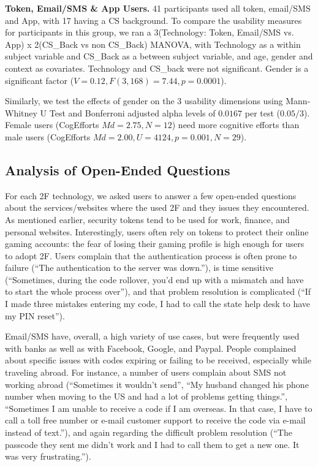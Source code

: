 \documentclass[conference]{IEEEtran}
\newcommand{\descr}[1]{\vspace{0.25cm} \noindent \textbf{#1}}
\begin{document}
\descr{Token, Email/SMS \& App Users.} 41 participants used all token, email/SMS and App, with 17 having a CS background. To compare the usability measures for participants in this group, we ran a 3(Technology: Token, Email/SMS vs. App) x 2(CS\_Back vs non CS\_Back) MANOVA, with Technology as a within subject variable and CS\_Back as a between subject variable, and age, gender and context as covariates. Technology and CS\_back were not significant. Gender is a significant factor ($V= 0.12, F(3,168) = 7.44, p = 0.0001$).



Similarly, we test the effects of gender on the 3 usability dimensions using Mann-Whitney U Test  and Bonferroni adjusted alpha levels of $0.0167$ per test ($0.05/3$). Female users (CogEfforts $Md = 2.75, N = 12$) need more cognitive efforts than male users (CogEfforts $Md = 2.00, U= 4124, p = 0.001, N = 29$).






\subsection{Analysis of Open-Ended Questions}
For each 2F technology, we asked users to answer a few open-ended questions about the services/websites where the used 2F and they issues they encountered. 
As mentioned earlier, security tokens tend to be used for work, finance, and personal websites. Interestingly, users often rely on tokens to protect their online gaming accounts: the fear of losing their gaming profile is high enough for users to adopt 2F. Users complain that the authentication process is often prone to failure (``The authentication to the server was down.''), is time sensitive (``Sometimes, during the code rollover, you'd end up with a mismatch and have to start the whole process over''), and that problem resolution is complicated (``If I made three mistakes entering my code, I had to call the state help desk to have my PIN reset''). 

Email/SMS have, overall, a high variety of use cases, but were frequently used with banks as well as with Facebook, Google, and Paypal. People complained about specific issues with codes expiring or failing to be received, especially while traveling abroad. For instance, a number of users complain about SMS not working abroad (``Sometimes it wouldn't send'', ``My husband changed his phone number when moving to the US and had a lot of problems getting things.'', ``Sometimes I am unable to receive a code if I am overseas. In that case, I have to call a toll free number or e-mail customer support to receive the code via e-mail instead of text.''), and again regarding the difficult problem resolution (``The passcode they sent me didn't work and I had to call them to get a new one. It was very frustrating.''). 
\end{document}
